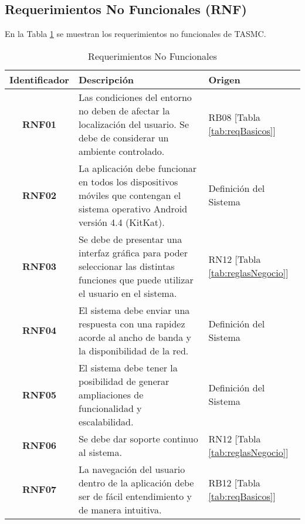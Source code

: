 \subsection{Requerimientos No Funcionales (RNF)}

En la Tabla \ref{tab:reqNoFuncionales} se muestran los requerimientos no funcionales de TASMC.

\begin{table}[h]
	\begin{center}
		\begin{tabular}{|c|p{8.4cm}|p{2.5cm}|}
			\hline \rowcolor[RGB]{51,153,255} 
				\textcolor{blanco}{\bf Identificador} &
				\textcolor{blanco}{\bf Descripción} &
				\textcolor{blanco}{\bf Origen} \\
			\hline 
				\textbf{RNF01} &
				Las condiciones del entorno no deben de afectar la localización del usuario. Se debe de considerar un ambiente controlado. &
				RB08 [Tabla \ref{tab:reqBasicos}]\\
      		\hline \rowcolor[RGB]{240,248,255}
      			\textbf{RNF02} &
				La aplicación debe funcionar en todos los dispositivos móviles que contengan el sistema operativo Android versión 4.4 (KitKat). &
				Definición del Sistema \\
			\hline 
				\textbf{RNF03} &
				Se debe de presentar una interfaz gráfica para poder seleccionar las distintas funciones que puede utilizar el usuario en el sistema. &
				RN12 [Tabla \ref{tab:reglasNegocio}] \\ 
			\hline \rowcolor[RGB]{240,248,255}
				\textbf{RNF04} &
				El sistema debe enviar una respuesta con una rapidez acorde al ancho de banda y la disponibilidad de la red. &
				Definición del Sistema \\ 
			\hline 
				\textbf{RNF05} &
				El sistema debe tener la posibilidad de generar ampliaciones de funcionalidad y escalabilidad. &
				Definición del Sistema \\ 
			\hline \rowcolor[RGB]{240,248,255}
				\textbf{RNF06} &
				Se debe dar soporte continuo al sistema. &
				RN12 [Tabla \ref{tab:reglasNegocio}]\\ 
			\hline 
				\textbf{RNF07} &
				La navegación del usuario dentro de la aplicación debe ser de fácil entendimiento y de manera intuitiva. &
				RB12 [Tabla \ref{tab:reqBasicos}]\\ 
			\hline
		\end{tabular}
	\end{center}
	\caption[Requerimientos No Funcionales]{Requerimientos No Funcionales} 
	\label{tab:reqNoFuncionales}
\end{table}